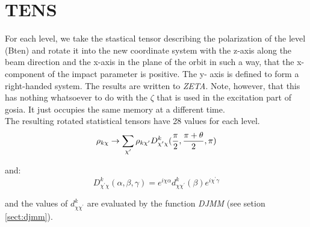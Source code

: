 \section{TENS}
\label{sect:tens}

\noindent For each level, we take the stastical tensor describing the
polarization of the level (Bten) and rotate it into the new coordinate system
with the z-axis along the beam direction and the x-axis in the plane of the
orbit in such a way, that the x-component of the impact parameter is positive.
The y- axis is defined to form a right-handed system. The results are written
to {\em ZETA}. Note, however, that this has nothing whatsoever to do with
the $\zeta$ that is used in the excitation part of gosia. It just occupies
the same memory at a different time.\\

\noindent The resulting rotated statistical tensors have 28 values for each
level.\\

\begin{equation}
\rho_{k \chi} \rightarrow \sum_{\chi^\prime} \rho_{k \chi^\prime}
D^k_{\chi^\prime \chi} \large( {\pi \over 2} , {\pi + \theta \over 2}, \pi
\large)
\end{equation}

\noindent and:\\

\begin{equation}
D^k_{\chi^\prime \chi}(\alpha, \beta, \gamma) = 
e^{i \chi \alpha} d^k_{\chi \chi^\prime}(\beta) e^{i \chi^\prime \gamma}
\end{equation}

\noindent and the values of $d^k_{\chi \chi^\prime}$ are evaluated by the
function {\em DJMM} (see setion \ref{sect:djmm}).\\
